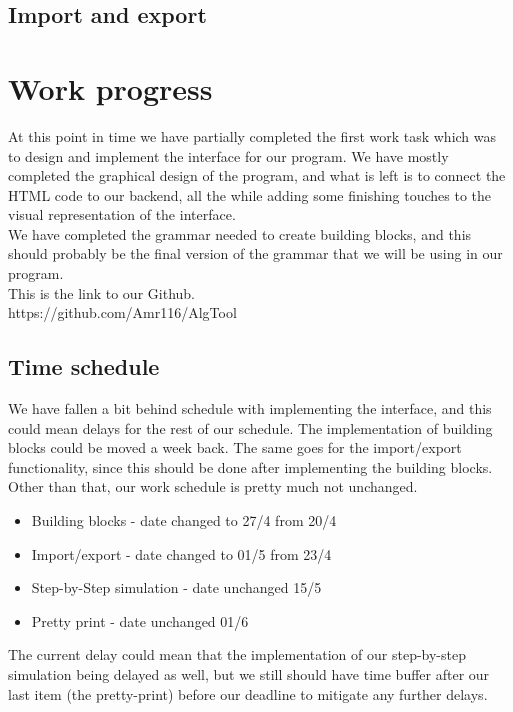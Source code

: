 \documentclass[11pt]{article}
\begin{document}
\subsection{Import and export}

\newpage
\section{Work progress}
At this point in time we have partially completed the first work task which was to design and implement the interface for our program. We have mostly completed the graphical design of the program, and what is left is to connect the HTML code to our backend, all the while adding some finishing touches to the visual representation of the interface.\\
We have completed the grammar needed to create building blocks, and this should probably be the final version of the grammar that we will be using in our program.\\
This is the link to our Github.\\
https://github.com/Amr116/AlgTool
\\
\subsection{Time schedule}
We have fallen a bit behind schedule with implementing the interface, and this could mean delays for the rest of our schedule. The implementation of building blocks could be moved a week back. The same goes for the import/export functionality, since this should be done after implementing the building blocks. Other than that, our work schedule is pretty much not unchanged.

\begin{itemize}
\item{Building blocks - date changed to 27/4 from 20/4}
\item{Import/export - date changed to 01/5 from 23/4}
\item{Step-by-Step simulation - date unchanged 15/5}
\item{Pretty print - date unchanged 01/6}
\end{itemize}

The current delay could mean that the implementation of our step-by-step simulation being delayed as well, but we still should have time buffer after our last item (the pretty-print) before our deadline to mitigate any further delays.
\newpage
\end{document}
